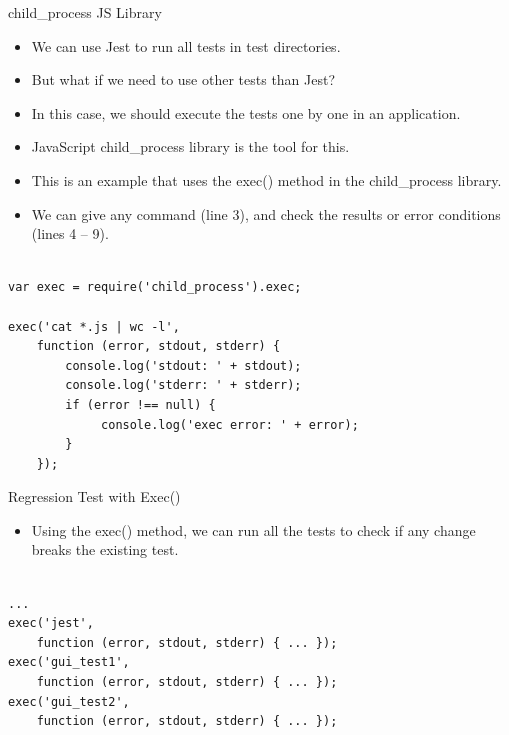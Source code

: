 \begin{frame}[fragile]{child\_process JS Library}

\begin{itemize}
	\item We can use Jest to run all tests in test directories. 
	\item But what if we need to use other tests than Jest?
	\item In this case, we should execute the tests one by one in an application. 
	\item JavaScript child\_process library is the tool for this. 
\end{itemize}

\end{frame}

\begin{frame}[fragile]{}

\begin{itemize}
	\item This is an example that uses the exec() method in the child\_process library. 
	\item We can give any command (line 3), and check the results or error conditions (lines 4 -- 9). 
\end{itemize}

\begin{Code}{}%
\begin{lstlisting}[firstnumber=1, label=glabels, xleftmargin=0pt, basicstyle=\scriptsize]% 

var exec = require('child_process').exec;

exec('cat *.js | wc -l',
    function (error, stdout, stderr) {
        console.log('stdout: ' + stdout);
        console.log('stderr: ' + stderr);
        if (error !== null) {
             console.log('exec error: ' + error);
        }
    });
\end{lstlisting}%
\end{Code}%
\end{frame}

\begin{frame}[fragile]{Regression Test with Exec()}

\begin{itemize}
	\item Using the exec() method, we can run all the tests to check if any change breaks the existing test. 
\end{itemize}

\begin{Code}{}%
\begin{lstlisting}[firstnumber=1, label=glabels, xleftmargin=0pt, basicstyle=\scriptsize]% 

...
exec('jest',
    function (error, stdout, stderr) { ... });
exec('gui_test1',
    function (error, stdout, stderr) { ... });    
exec('gui_test2',
    function (error, stdout, stderr) { ... });    
\end{lstlisting}%
\end{Code}%

\end{frame}
